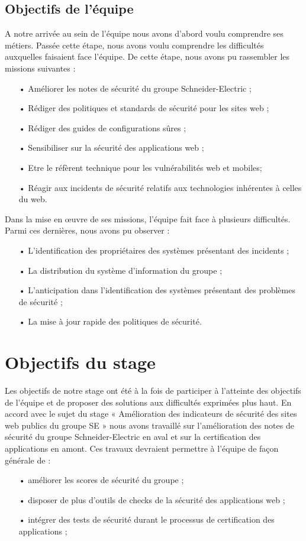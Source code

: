 \documentclass[a4paper,12pt]{book}
\theoremstyle{break}
\begin{document}
\subsection{Objectifs de l'équipe}
A notre arrivée au sein de l'équipe nous avons d’abord voulu comprendre ses métiers. Passée cette étape, nous avons voulu comprendre les difficultés auxquelles faisaient face l’équipe. De cette étape, nous avons pu rassembler les missions suivantes : 
\begin{itemize}
    \item[•] Améliorer les notes de sécurité du groupe Schneider-Electric ; 
    \item[•] Rédiger des politiques et standards de sécurité pour les sites web ;
    \item[•] Rédiger des guides de configurations sûres ;
    \item[•] Sensibiliser sur la sécurité des applications web ; 
    \item[•] Etre le réfèrent technique pour les vulnérabilités web et mobiles; 
    \item[•] Réagir aux incidents de sécurité relatifs aux technologies inhérentes à celles du web.
\end{itemize}
Dans la mise en  œuvre de ses missions, l'équipe fait face à plusieurs difficultés. Parmi ces dernières, nous avons pu observer :
\begin{itemize}
   \item[•] L'identification des propriétaires des systèmes présentant des incidents ;
   \item[•] La distribution du système d’information du groupe ; 
   \item[•] L'anticipation dans l’identification des systèmes présentant des problèmes de sécurité ;
   \item[•] La mise à jour rapide des politiques de sécurité.
\end{itemize}

\section{Objectifs du stage}
Les objectifs de notre stage ont été à la fois de participer à l’atteinte des objectifs de l’équipe et de proposer des solutions aux difficultés exprimées plus haut. En accord avec le sujet du stage « Amélioration des indicateurs de sécurité des sites web publics du groupe SE » nous avons travaillé sur l’amélioration des notes de sécurité du groupe Schneider-Electric en aval et sur la certification des applications en amont. 
Ces travaux devraient permettre à l’équipe de façon générale de : 
\begin{itemize}
    \item[•] améliorer les scores de sécurité du groupe ;
    \item[•] disposer de plus d’outils de checks de la sécurité des applications web ;
    \item[•] intégrer des tests de sécurité durant le processus de certification des applications ;
\end{itemize}
\end{document}
